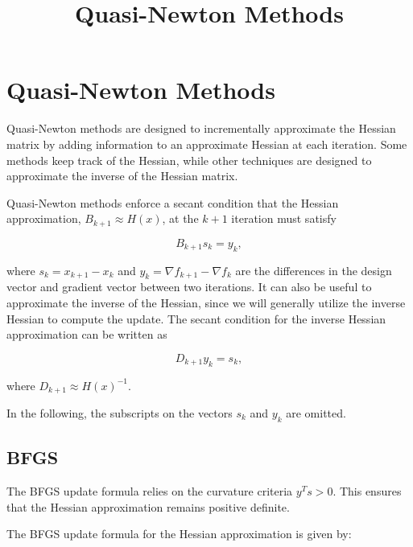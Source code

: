 \documentclass[11pt]{article}
\title{Quasi-Newton Methods}
\begin{document}
    
    
    \maketitle
    
    

    
    \section{Quasi-Newton Methods}\label{quasi-newton-methods}

Quasi-Newton methods are designed to incrementally approximate the
Hessian matrix by adding information to an approximate Hessian at each
iteration. Some methods keep track of the Hessian, while other
techniques are designed to approximate the inverse of the Hessian
matrix.

Quasi-Newton methods enforce a secant condition that the Hessian
approximation, \(B_{k+1} \approx H(x)\), at the \(k+1\) iteration must
satisfy

\begin{equation*}
    B_{k+1} s_{k} = y_{k},
\end{equation*}

where \(s_{k} = x_{k+1} - x_{k}\) and
\(y_{k} = \nabla f_{k+1} - \nabla f_{k}\) are the differences in the
design vector and gradient vector between two iterations. It can also be
useful to approximate the inverse of the Hessian, since we will
generally utilize the inverse Hessian to compute the update. The secant
condition for the inverse Hessian approximation can be written as

\begin{equation*}
    D_{k+1} y_{k} = s_{k},
\end{equation*}

where \(D_{k+1} \approx H(x)^{-1}\).

In the following, the subscripts on the vectors \(s_{k}\) and \(y_{k}\)
are omitted.

\subsection{BFGS}\label{bfgs}

The BFGS update formula relies on the curvature criteria
\(y^{T} s > 0\). This ensures that the Hessian approximation remains
positive definite.

The BFGS update formula for the Hessian approximation is given by:
\end{document}
